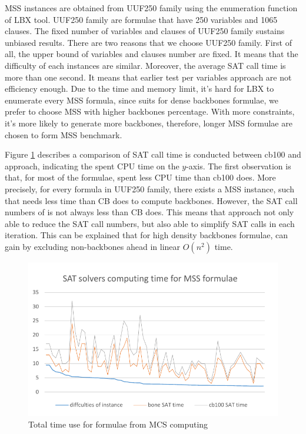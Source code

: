 MSS instances are obtained from UUF250 family using the enumeration function of LBX\cite{MPA2015} tool. UUF250 family are formulae that have 250 variables and 1065 clauses. The fixed number of variables and clauses of UUF250 family sustains unbiased results.
There are two reasons that we choose UUF250 family. First of all, the upper bound of variables and clauses number are fixed. It means that the difficulty of each instances are similar. Moreover, the average SAT call time is more than one second. It means that earlier test per variables approach are not efficiency enough.
Due to the time and memory limit, it's hard for LBX to enumerate every MSS formula, since \tool suits for dense backbones formulae, we prefer to choose MSS with higher backbones percentage. With more constraints, it's more likely to generate more backbones, therefore, longer MSS formulae are chosen to form MSS benchmark.

Figure \ref{fig:mcs-time} describes a comparison of SAT call time is conducted between cb100 and \tool approach, indicating the spent CPU time on the $y$-axis. The first observation is that, for most of the formulae, \tool spent less CPU time than cb100 does. More precisely, for every formula in UUF250 family, there exists a MSS instance, such that \tool needs less time than CB does to compute backbones. However, the SAT call numbers of \tool is not always less than CB does. This means that \tool approach not only able to reduce the SAT call numbers, but also able to simplify SAT calls in each iteration. This can be explained that for high density backbones formulae, \tool can gain by excluding non-backbones ahead in linear $O(n^2)$ time.

\begin{figure}
    \centering
    \includegraphics[scale=0.7]{mcs.pdf}
   \caption{Total time use for formulae from MCS computing}
   \label{fig:mcs-time}
\end{figure}


